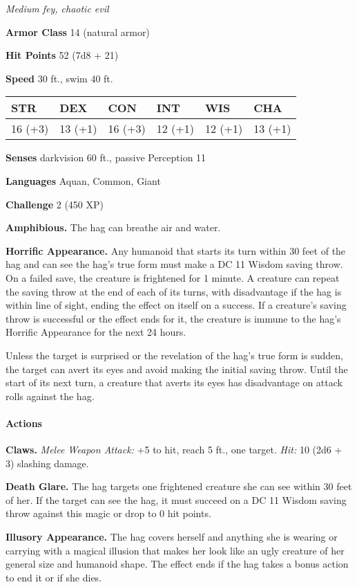 \documentclass[
]{article}
\begin{document}
\emph{Medium fey, chaotic evil}

\textbf{Armor Class} 14 (natural armor)

\textbf{Hit Points} 52 (7d8 + 21)

\textbf{Speed} 30 ft., swim 40 ft.

\begin{longtable}[]{@{}llllll@{}}
\toprule
STR & DEX & CON & INT & WIS & CHA\tabularnewline
\midrule
\endhead
16 (+3) & 13 (+1) & 16 (+3) & 12 (+1) & 12 (+1) & 13 (+1)\tabularnewline
\bottomrule
\end{longtable}

\textbf{Senses} darkvision 60 ft., passive Perception 11

\textbf{Languages} Aquan, Common, Giant

\textbf{Challenge} 2 (450 XP)

\textbf{Amphibious.} The hag can breathe air and water.

\textbf{Horrific Appearance.} Any humanoid that starts its turn within
30 feet of the hag and can see the hag's true form must make a DC 11
Wisdom saving throw. On a failed save, the creature is frightened for 1
minute. A creature can repeat the saving throw at the end of each of its
turns, with disadvantage if the hag is within line of sight, ending the
effect on itself on a success. If a creature's saving throw is
successful or the effect ends for it, the creature is immune to the
hag's Horrific Appearance for the next 24 hours.

Unless the target is surprised or the revelation of the hag's true form
is sudden, the target can avert its eyes and avoid making the initial
saving throw. Until the start of its next turn, a creature that averts
its eyes has disadvantage on attack rolls against the hag.

\hypertarget{actions-2}{%
\paragraph{Actions}\label{actions-2}}

\textbf{Claws.} \emph{Melee Weapon Attack:} +5 to hit, reach 5 ft., one
target. \emph{Hit:} 10 (2d6 + 3) slashing damage.

\textbf{Death Glare.} The hag targets one frightened creature she can
see within 30 feet of her. If the target can see the hag, it must
succeed on a DC 11 Wisdom saving throw against this magic or drop to 0
hit points.

\textbf{Illusory Appearance.} The hag covers herself and anything she is
wearing or carrying with a magical illusion that makes her look like an
ugly creature of her general size and humanoid shape. The effect ends if
the hag takes a bonus action to end it or if she dies.
\end{document}
